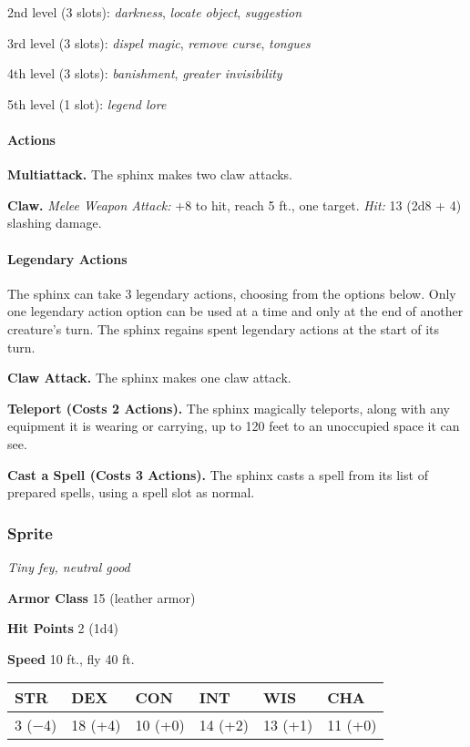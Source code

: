 \documentclass[
]{article}
\begin{document}
2nd level (3 slots): \emph{darkness}, \emph{locate object},
\emph{suggestion}

3rd level (3 slots): \emph{dispel magic}, \emph{remove curse},
\emph{tongues}

4th level (3 slots): \emph{banishment}, \emph{greater invisibility}

5th level (1 slot): \emph{legend lore}

\hypertarget{actions-11}{%
\paragraph{Actions}\label{actions-11}}

\textbf{Multiattack.} The sphinx makes two claw attacks.

\textbf{Claw.} \emph{Melee Weapon Attack:} +8 to hit, reach 5 ft., one
target. \emph{Hit:} 13 (2d8 + 4) slashing damage.

\hypertarget{legendary-actions-1}{%
\paragraph{Legendary Actions}\label{legendary-actions-1}}

The sphinx can take 3 legendary actions, choosing from the options
below. Only one legendary action option can be used at a time and only
at the end of another creature's turn. The sphinx regains spent
legendary actions at the start of its turn.

\textbf{Claw Attack.} The sphinx makes one claw attack.

\textbf{Teleport (Costs 2 Actions).} The sphinx magically teleports,
along with any equipment it is wearing or carrying, up to 120 feet to an
unoccupied space it can see.

\textbf{Cast a Spell (Costs 3 Actions).} The sphinx casts a spell from
its list of prepared spells, using a spell slot as normal.

\hypertarget{sprite}{%
\subsubsection{Sprite}\label{sprite}}

\emph{Tiny fey, neutral good}

\textbf{Armor Class} 15 (leather armor)

\textbf{Hit Points} 2 (1d4)

\textbf{Speed} 10 ft., fly 40 ft.

\begin{longtable}[]{@{}llllll@{}}
\toprule
STR & DEX & CON & INT & WIS & CHA\tabularnewline
\midrule
\endhead
3 (−4) & 18 (+4) & 10 (+0) & 14 (+2) & 13 (+1) & 11 (+0)\tabularnewline
\bottomrule
\end{longtable}
\end{document}
